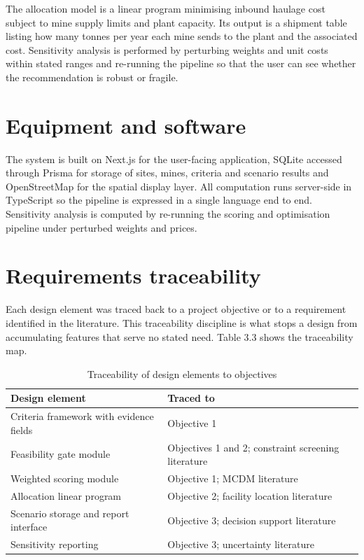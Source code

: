\documentclass[12pt,a4paper]{report}
\begin{document}
The allocation model is a linear program minimising inbound haulage
cost subject to mine supply limits and plant capacity. Its output is
a shipment table listing how many tonnes per year each mine sends to
the plant and the associated cost. Sensitivity analysis is performed
by perturbing weights and unit costs within stated ranges and
re-running the pipeline so that the user can see whether the
recommendation is robust or fragile.

\section{Equipment and software}
The system is built on Next.js for the user-facing application, SQLite
accessed through Prisma for storage of sites, mines, criteria and
scenario results and OpenStreetMap for the spatial display layer. All
computation runs server-side in TypeScript so the pipeline is expressed
in a single language end to end. Sensitivity analysis is computed by
re-running the scoring and optimisation pipeline under perturbed
weights and prices.

\section{Requirements traceability}
Each design element was traced back to a project objective or to a
requirement identified in the literature. This traceability discipline
is what stops a design from accumulating features that serve no stated
need. Table 3.3 shows the traceability map.

\begin{table}[h]
\centering
\caption{Traceability of design elements to objectives}
\begin{tabular}{p{5.4cm}p{7.6cm}}
\toprule
Design element & Traced to \\
\midrule
Criteria framework with evidence fields & Objective 1 \\
Feasibility gate module & Objectives 1 and 2; constraint screening
literature \\
Weighted scoring module & Objective 1; MCDM literature \\
Allocation linear program & Objective 2; facility location literature \\
Scenario storage and report interface & Objective 3; decision support
literature \\
Sensitivity reporting & Objective 3; uncertainty literature \\
\bottomrule
\end{tabular}
\end{table}
\end{document}
